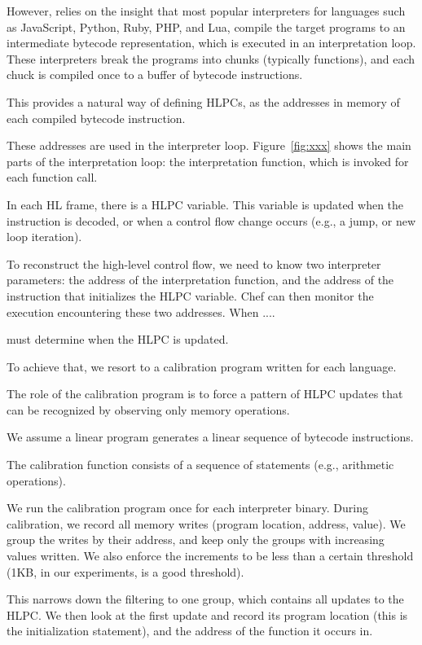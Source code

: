 However, \chef relies on the insight that most popular interpreters for languages such as JavaScript, Python, Ruby, PHP, and Lua, compile the target programs to an intermediate bytecode representation, which is executed in an interpretation loop.
%
These interpreters break the programs into chunks (typically functions), and each chuck is compiled once to a buffer of bytecode instructions.

This provides a natural way of defining HLPCs, as the addresses in memory of each compiled bytecode instruction.

These addresses are used in the interpreter loop.  Figure~\ref{fig:xxx} shows the main parts of the interpretation loop:  the interpretation function, which is invoked for each function call.

In each HL frame, there is a HLPC variable.  This variable is updated when the instruction is decoded, or when a control flow change occurs (e.g., a jump, or new loop iteration).

To reconstruct the high-level control flow, we need to know two interpreter parameters: the address of the interpretation function, and the address of the instruction that initializes the HLPC variable.  Chef can then monitor the execution encountering these two addresses.  When ....

\chef must determine when the HLPC is updated.

To achieve that, we resort to a calibration program written for each language.

The role of the calibration program is to force a pattern of HLPC updates that can be recognized by observing only memory operations.

We assume a linear program generates a linear sequence of bytecode instructions.

The calibration function consists of a sequence of statements (e.g., arithmetic operations).

We run the calibration program once for each interpreter binary.  During calibration, we record all memory writes (program location, address, value).  We group the writes by their address, and keep only the groups with increasing values written.  We also enforce the increments to be less than a certain threshold (1KB, in our experiments, is a good threshold).

This narrows down the filtering to one group, which contains all updates to the HLPC.  We then look at the first update and record its program location (this is the initialization statement), and the address of the function it occurs in.

